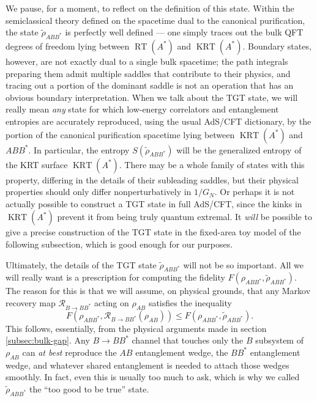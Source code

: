\documentclass[a4paper,11pt]{article}
\renewcommand{\tilde}{\widetilde}
\newcommand{\RT}{\operatorname{RT}}
\newcommand{\KRT}{\operatorname{KRT}}
\begin{document}
We pause, for a moment, to reflect on the definition of this state. Within the semiclassical theory defined on the spacetime dual to the canonical purification, the state $\tilde{\rho}_{ABB^*}$ is perfectly well defined --- one simply traces out the bulk QFT degrees of freedom lying between $\RT(A^*)$ and $\KRT(A^*)$. Boundary states, however, are not exactly dual to a single bulk spacetime; the path integrals preparing them admit multiple saddles that contribute to their physics, and tracing out a portion of the dominant saddle is not an operation that has an obvious boundary interpretation. When we talk about the TGT state, we will really mean \emph{any} state for which low-energy correlators and entanglement entropies are accurately reproduced, using the usual AdS/CFT dictionary, by the portion of the canonical purification spacetime lying between $\KRT(A^*)$ and $ABB^*$. In particular, the entropy $S(\tilde{\rho}_{ABB^*})$ will be the generalized entropy of the KRT surface $\KRT(A^*)$. There may be a whole family of states with this property, differing in the details of their subleading saddles, but their physical properties should only differ nonperturbatively in $1/G_N.$ Or perhaps it is not actually possible to construct a TGT state in full AdS/CFT, since the kinks in $\KRT(A^*)$ prevent it from being truly quantum extremal. It \emph{will} be possible to give a precise construction of the TGT state in the fixed-area toy model of the following subsection, which is good enough for our purposes.

Ultimately, the details of the TGT state $\tilde{\rho}_{ABB^*}$ will not be so important. All we will really want is a prescription for computing the fidelity $F(\rho_{ABB^*}, \tilde{\rho}_{ABB^*}).$ The reason for this is that we will assume, on physical grounds, that any Markov recovery map $\mathcal{R}_{B \rightarrow BB^*}$ acting on $\rho_{AB}$ satisfies the inequality
\begin{equation} \label{eq:interm-fidelity-inequality}
    F(\rho_{ABB^*}, \mathcal{R}_{B \rightarrow B B^*}(\rho_{AB})) \leq F(\rho_{ABB^*}, \tilde{\rho}_{ABB^*}).
\end{equation}
This follows, essentially, from the physical arguments made in section \ref{subsec:bulk-gap}. Any $B \rightarrow BB^*$ channel that touches only the $B$ subsystem of $\rho_{AB}$ can \emph{at best} reproduce the $AB$ entanglement wedge, the $BB^*$ entanglement wedge, and whatever shared entanglement is needed to attach those wedges smoothly. In fact, even this is usually too much to ask, which is why we called $\tilde{\rho}_{ABB^*}$ the ``too good to be true'' state.
\end{document}
